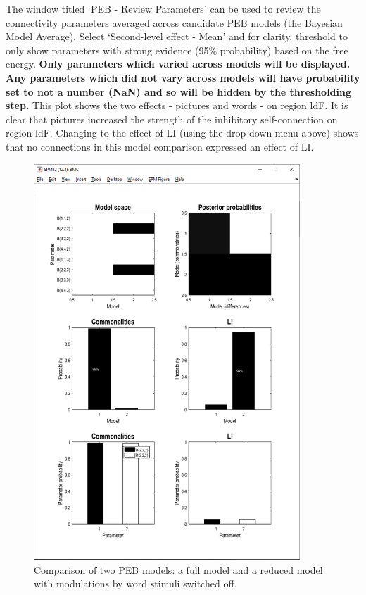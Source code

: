 \documentclass{article}
\begin{document}
The window titled `PEB - Review Parameters' can be used to review the connectivity parameters averaged across candidate PEB models (the Bayesian Model Average). Select `Second-level effect - Mean' and for clarity, threshold to only show parameters with strong evidence (95\% probability) based on the free energy. \textbf{Only parameters which varied across models will be displayed. Any parameters which did not vary across models will have probability set to not a number (NaN) and so will be hidden by the thresholding step.} This plot shows the two effects - pictures and words - on region ldF. It is clear that pictures increased the strength of the inhibitory self-connection on region ldF. Changing to the effect of LI  (using the drop-down menu above) shows that no connections in this model comparison expressed an effect of LI.

\begin{figure}[ht]
\begin{center}
\includegraphics[width=10cm]{"Fig_peb_2model_bmc"}
\caption{Comparison of two PEB models: a full model and a reduced model with modulations by word stimuli switched off.\label{Fig_peb_2model_bmc}}
\end{center}
\end{figure}
\end{document}
